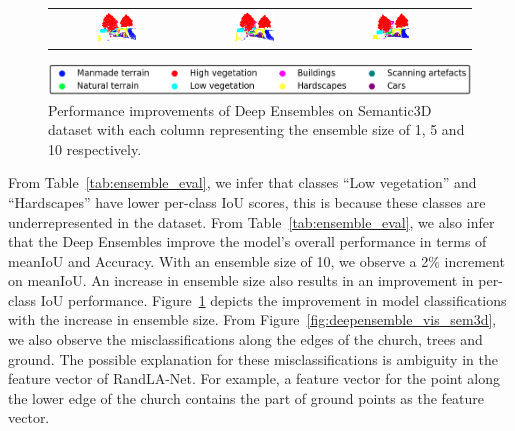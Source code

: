 \begin{figure}[h!]
\begin{tabular}{cccc}
            \includegraphics[width=0.30\textwidth, height=0.15\textheight]{images/seg_output/deep_ensembles/2_1.pdf} &
            \includegraphics[width=0.30\textwidth, height=0.15\textheight]{images/seg_output/deep_ensembles/2_5.pdf}& 
            \includegraphics[width=0.30\textwidth, height=0.15\textheight]{images/seg_output/deep_ensembles/2_10.pdf}\\
        \end{tabular}
        \includegraphics[scale=0.45]{images/legend.png}
        \caption{Performance improvements of Deep Ensembles on Semantic3D dataset with each column representing the ensemble size of 1, 5 and 10 respectively.}
        \label{fig:deepensemble_improv}
    \end{figure}
    From Table~\ref{tab:ensemble_eval}, we infer that classes ``Low vegetation'' and ``Hardscapes'' have lower per-class IoU scores, this is because these classes are underrepresented in the dataset.
    From Table~\ref{tab:ensemble_eval}, we also infer that the Deep Ensembles improve the model's overall performance in terms of meanIoU and Accuracy.
    With an ensemble size of 10, we observe a 2\% increment on meanIoU.
    An increase in ensemble size also results in an improvement in per-class IoU performance.
    Figure~\ref{fig:deepensemble_improv} depicts the improvement in model classifications with the increase in ensemble size.
    From Figure~\ref{fig:deepensemble_vis_sem3d}, we also observe the misclassifications along the edges of the church, trees and ground.
    The possible explanation for these misclassifications is ambiguity in the feature vector of RandLA-Net. For example, a feature vector for the point along the lower edge of the church contains the part of ground points as the feature vector.
